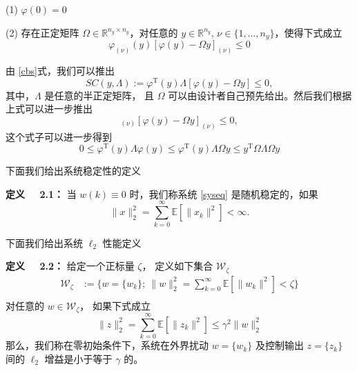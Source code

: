 		(1) $\varphi(0)=0$ 
		
		(2) 存在正定矩阵 $\varOmega \in\mathbb{R}^{n_y\times n_y}$，对任意的 $y\in\mathbb{R}^{n_y}$, $\nu \in\{1,\dots,n_y\}$，使得下式成立 
		\begin{equation}\label{cbs} 
		\varphi_{(\nu)}(y)[\varphi(y)-\varOmega y ]_{(\nu)}\leq 0
		\end{equation}
		
	由 \eqref{cbs}式，我们可以推出
	\begin{equation}\label{scieq}
	SC(y,\varLambda):= \varphi^{\mathrm{T}}(y)\varLambda[\varphi(y)-\varOmega y]\leq0,
	\end{equation}
	其中，$\varLambda$ 是任意的半正定矩阵， 且 $\varOmega$ 可以由设计者自己预先给出。然后我们根据上式可以进一步推出
	\begin{equation}
	[\varOmega y]_{(\nu)}[\varphi(y)-\varOmega y]_{(\nu)}\leq0,
	\end{equation}
	这个式子可以进一步得到
	\begin{equation}
	0\leq\varphi^{\mathrm{T}}(y)\varLambda\varphi(y) \leq \varphi^{\mathrm{T}}(y)\varLambda\varOmega y \leq y^{\mathrm{T}}\varOmega\varLambda\varOmega y
	\end{equation}
	
	下面我们给出系统稳定性的定义
	
	{\bf 定义 \ \ 2.1：} 
	当 $w(k)\equiv0$ 时，我们称系统 \eqref{syseq} 是随机稳定的，如果
	\begin{equation}
	\|x\|^2_2=\sum_{k=0}^{\infty}\mathbb{E}[\|x_k\|^2]<\infty.
	\end{equation} 
	
	下面我们给出系统 $\ell_2$ 性能定义
	
	{\bf 定义 \ \ 2.2：}
	给定一个正标量 $\zeta$， 定义如下集合 $\mathcal{W}_{\zeta} $ 	
	\begin{equation}
		\begin{split}
			\mathcal{W}_{\zeta}&:=\Big\{ w=\{w_k\}; \   \|w\|^2_2=\sum_{k=0}^{\infty}\mathbb{E}[\|w_k\|^{2}]<\zeta\Big\}\\
		\end{split}
	\end{equation}
	对任意的  $w\in\mathcal{W}_{\zeta}$， 如果下式成立
	\begin{equation}
		\|z\|^2_2=\sum_{k=0}^{\infty}\mathbb{E}\left[\|z_k\|^2\right] \leq \gamma^{2}\|w\|^2_2
	\end{equation}
	那么，我们称在零初始条件下，系统在外界扰动 $w=\{w_k\}$ 及控制输出 $z=\{z_k\}$ 间的 $\ell_2$ 增益是小于等于 $\gamma$ 的。
	
